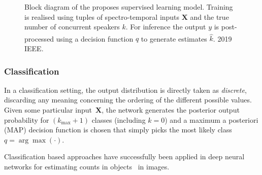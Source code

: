\begin{figure}[t]
  \centering
  \begin{adjustbox}{width=.8\textwidth}
    
  \end{adjustbox}
\caption{%
Block diagram of the proposes supervised learning model.
Training is realised using tuples of spectro-temporal inputs \(\mathbf{X}\) and
the true number of concurrent speakers \(k\). For inference the output \(y\) is post-processed using a decision function \(q\) to generate estimates \(\hat{k}\). \textsuperscript{\textregistered}2019 IEEE.
}%
\label{fig:blockdiagram}
\end{figure}

\subsubsection{Classification}
In a classification setting, the output distribution is directly taken as \textit{discrete}, discarding any meaning concerning the ordering of the different possible values.
Given some particular input~$\mathbf{X}$, the network generates the posterior output probability for \((k_{\max} + 1)\) classes (including \(k=0\)) and a maximum a posteriori (MAP) decision function is chosen that simply picks the most likely class \(q = \arg\max(\cdot)\).

Classification based approaches have successfully been applied in deep neural networks for estimating counts in objects~\cite{segui15, zhang2015salient, khan16} in images.

